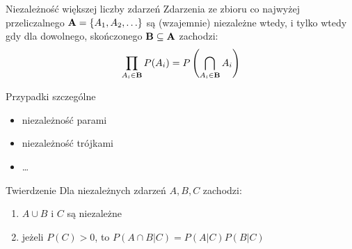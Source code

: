 \documentclass{beamer}
\newcommand{\set}[1]{\ensuremath\mathbf{#1}}
\begin{document}
\begin{frame}{Niezależność większej liczby zdarzeń}
Zdarzenia ze zbioru co najwyżej przeliczalnego $\set{A}=\{A_1, A_2, \ldots\}$ są (wzajemnie) niezależne wtedy, i tylko wtedy gdy dla dowolnego, skończonego $\set{B}\subseteq \set{A}$ zachodzi:
\[ \prod_{A_i\in \set{B}} P(A_i)=P\left(\bigcap_{A_i\in \set{B}}A_i\right)\]
{
	\begin{block}{Przypadki szczególne}
	\begin{itemize}
	\item niezależność parami
	\item niezależność trójkami
	\item \ldots
	\end{itemize}
	\end{block}
}
{
	\begin{block}{Twierdzenie}
	Dla niezależnych zdarzeń $A, B, C$ zachodzi:
	\begin{enumerate}
	\item $A\cup B$ i $C$ są niezależne
	\item jeżeli $P(C)>0$, to $P(A\cap B|C)=P(A|C)P(B|C)$
	\end{enumerate}
	\end{block}
}
\end{frame}
\end{document}
